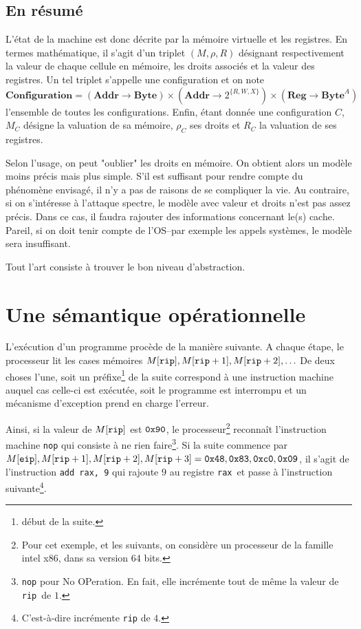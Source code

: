 \documentclass{book}
\newcommand{\code}[1]{\texttt{#1}}
\newcommand{\eip}{{\tt eip}\xspace}
\newcommand{\rip}{{\tt rip}\xspace}
\newcommand{\rax}{{\tt rax}\xspace}
\newcommand{\hexa}[1]{{\tt 0x#1}}
\newcommand{\Byte}{{\mathbf{Byte}}}
\newcommand{\Addr}{{\mathbf{Addr}}}
\newcommand{\Reg}{{\mathbf{Reg}}}
\newcommand{\Configuration}{{\mathbf{Configuration}}}
\begin{document}
{\subsection{En résumé}

L'état de la machine est donc décrite par la mémoire virtuelle et les registres. En termes mathématique, il s'agit d'un triplet $(M, \rho, R)$ désignant respectivement la valeur de chaque cellule en mémoire, les droits associés et la valeur des registres. Un tel triplet s'appelle une configuration et on note $$\Configuration = (\Addr \to \Byte) \times (\Addr \to 2^{\{R,W,X\}}) \times (\Reg \to \Byte^A)$$ 
l'ensemble de toutes les configurations. Enfin, étant donnée une configuration $C$, $M_C$ désigne la valuation de sa mémoire, $\rho_C$ ses droits et $R_C$ la valuation de ses  registres. 


 Selon l'usage, on peut "oublier" les droits en mémoire. On obtient alors un modèle moins précis mais plus simple. S'il est suffisant pour rendre compte du phénomène envisagé, il n'y a pas de raisons de se compliquer la vie. Au contraire, si on s'intéresse à l'attaque {\sc spectre}, le modèle avec valeur et droits n'est pas assez précis. Dans ce cas, il faudra rajouter des informations concernant le(s) cache. Pareil, si on doit tenir compte de l'OS--par exemple les appels systèmes, le modèle sera insuffisant. 
 
 Tout l'art consiste à trouver le bon niveau d'abstraction.
 
\section{Une sémantique opérationnelle}


L'exécution d'un programme procède de la manière suivante. A chaque étape, le processeur lit les cases mémoires $M[\rip], M[\rip+1], M[\rip+2], \ldots$ De deux choses l'une, soit un préfixe\footnote{début de la suite.} de la suite correspond à une instruction machine auquel cas celle-ci est exécutée, soit le programme est interrompu et un mécanisme d'exception prend en charge l'erreur. 

Ainsi, si la valeur de  $M[\rip]$ est $\hexa{90}$, le processeur\footnote{Pour cet exemple, et les suivants, on considère un processeur de la famille {\sc intel x86}, dans sa version 64 bits.} reconnaît l'instruction machine \code{nop} qui consiste à ne rien faire\footnote{{\tt nop} pour No OPeration. En fait, elle incrémente tout de même la valeur de \rip\ de $1$. }. Si la suite commence par $M[\eip], M[\rip+1], M[\rip+2], M[\rip+3]= \hexa{48}, \hexa{83}, \hexa{c0}, \hexa{09}$, il s'agit de l'instruction  {\tt add rax, 9} qui rajoute $9$ au registre \rax\ et passe à l'instruction suivante\footnote{C'est-à-dire incrémente \rip de $4$.}.  

}
\end{document}
